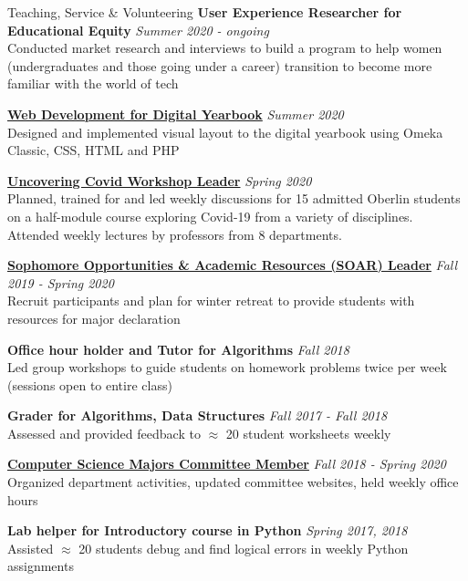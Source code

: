 \documentclass{resume}
\begin{document}
\begin{rSection}{Teaching, Service \& Volunteering} 
{\bf User Experience Researcher for Educational Equity} \hfill{\em Summer 2020 - ongoing} \\
Conducted market research and interviews to build a program to help women (undergraduates and those going under a career) transition to become more familiar with the world of tech 

{\bf \href{https://www.oc2020.oberlincollegelibrary.org/}{Web Development for Digital Yearbook}} \hfill{\em Summer 2020} \\
Designed and implemented visual layout to the digital yearbook using Omeka Classic, CSS, HTML and PHP

{\bf \href{https://www.oberlin.edu/admissions-and-aid/for-accepted-students/virtual-visits/covid-19-course}{Uncovering Covid Workshop Leader}} \hfill{\em Spring 2020} \\
Planned, trained for and led weekly discussions for 15 admitted Oberlin students on a half-module course exploring Covid-19 from a variety of disciplines. Attended weekly lectures by professors from 8 departments.

{\bf \href{https://www.oberlin.edu/career/set/soar/soar-leaders}{Sophomore Opportunities \& Academic Resources (SOAR) Leader}} \hfill{\em Fall 2019 - Spring 2020} \\
Recruit participants and plan for winter retreat to provide students with resources for major declaration

{\bf Office hour holder and Tutor for Algorithms} \hfill {\em Fall 2018} \\
{ Led group workshops to guide students on homework problems twice per week (sessions open to entire class)} 

{\bf Grader for Algorithms, Data Structures} \hfill {\em Fall 2017 - Fall 2018} \\
{ Assessed and provided feedback to  $\approx$ 20 student worksheets weekly} 

\href{http://www.cs.oberlin.edu/~csmc/officers.php}{\textbf{Computer Science Majors Committee Member}} \hfill {\em Fall 2018 - Spring 2020} \\
{ Organized department activities, updated committee websites, held weekly office hours} 

{\bf Lab helper for Introductory course in Python} \hfill {\em Spring 2017, 2018} \\
{ Assisted $\approx$ 20 students debug and find logical errors in weekly Python assignments}


\end{rSection}
\end{document}
